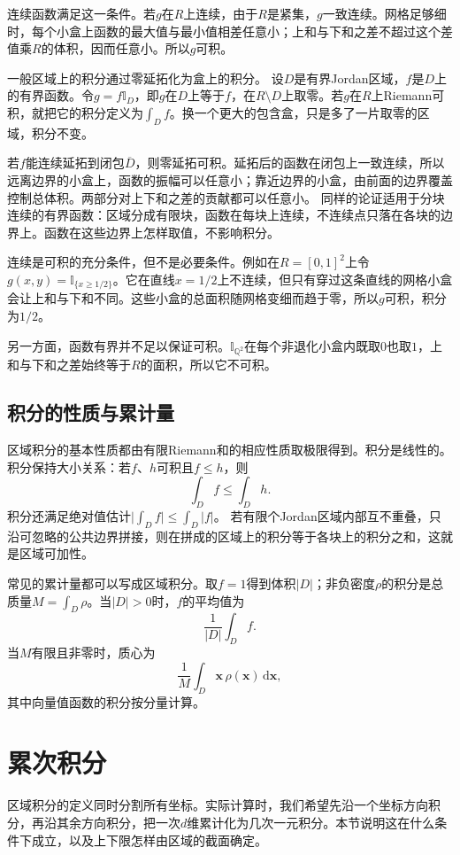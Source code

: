 连续函数满足这一条件。若$g$在$R$上连续，由于$R$是紧集，$g$一致连续。网格足够细时，每个小盒上函数的最大值与最小值相差任意小；上和与下和之差不超过这个差值乘$R$的体积，因而任意小。所以$g$可积。

一般区域上的积分通过零延拓化为盒上的积分。
设$D$是有界Jordan区域，$f$是$D$上的有界函数。令$g=f\mathbb I_D$，即$g$在$D$上等于$f$，在$R\setminus D$上取零。若$g$在$R$上Riemann可积，就把它的积分定义为$\int_D f$。换一个更大的包含盒，只是多了一片取零的区域，积分不变。

若$f$能连续延拓到闭包$\overline D$，则零延拓可积。延拓后的函数在闭包上一致连续，所以远离边界的小盒上，函数的振幅可以任意小；靠近边界的小盒，由前面的边界覆盖控制总体积。两部分对上下和之差的贡献都可以任意小。
同样的论证适用于分块连续的有界函数：区域分成有限块，函数在每块上连续，不连续点只落在各块的边界上。函数在这些边界上怎样取值，不影响积分。

连续是可积的充分条件，但不是必要条件。例如在$R=[0,1]^2$上令$g(x,y)=\mathbb I_{\{x\geq1/2\}}$。它在直线$x=1/2$上不连续，但只有穿过这条直线的网格小盒会让上和与下和不同。这些小盒的总面积随网格变细而趋于零，所以$g$可积，积分为$1/2$。

另一方面，函数有界并不足以保证可积。$\mathbb I_{\mathbb Q^2}$在每个非退化小盒内既取$0$也取$1$，上和与下和之差始终等于$R$的面积，所以它不可积。

\subsection{积分的性质与累计量}

区域积分的基本性质都由有限Riemann和的相应性质取极限得到。积分是线性的。积分保持大小关系：若$f$、$h$可积且$f\leq h$，则
\[
 \int_D f\leq\int_D h.
\]
积分还满足绝对值估计$\bigl|\int_D f\bigr|\leq\int_D|f|$。
若有限个Jordan区域内部互不重叠，只沿可忽略的公共边界拼接，则在拼成的区域上的积分等于各块上的积分之和，这就是区域可加性。

常见的累计量都可以写成区域积分。取$f=1$得到体积$|D|$；非负密度$\rho$的积分是总质量$M=\int_D\rho$。当$|D|>0$时，$f$的平均值为
\[
 \frac1{|D|}\int_D f.
\]
当$M$有限且非零时，质心为
\[
 \frac1M\int_D\bm x\,\rho(\bm x)\,\mathrm d\bm x,
\]
其中向量值函数的积分按分量计算。

\section{累次积分}

区域积分的定义同时分割所有坐标。实际计算时，我们希望先沿一个坐标方向积分，再沿其余方向积分，把一次$d$维累计化为几次一元积分。本节说明这在什么条件下成立，以及上下限怎样由区域的截面确定。

